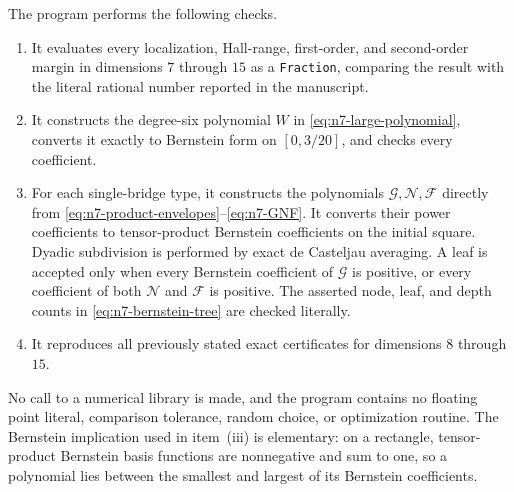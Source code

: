 \documentclass[11pt]{article}
\theoremstyle{definition}
\newcommand{\1}{\mathbf{1}}
\begin{document}
The program performs the following checks.
\begin{enumerate}[label=\textup{(\roman*)}]
\item It evaluates every localization, Hall-range, first-order, and
second-order margin in dimensions $7$ through $15$ as a
\texttt{Fraction}, comparing the result with the literal rational number
reported in the manuscript.
\item It constructs the degree-six polynomial $W$ in
\eqref{eq:n7-large-polynomial}, converts it exactly to Bernstein form on
$[0,3/20]$, and checks every coefficient.
\item For each single-bridge type, it constructs the polynomials
$\mathcal G,\mathcal N,\mathcal F$ directly from
\eqref{eq:n7-product-envelopes}--\eqref{eq:n7-GNF}.  It converts their power
coefficients to tensor-product Bernstein coefficients on the initial square.
Dyadic subdivision is performed by exact de Casteljau averaging.  A leaf is
accepted only when every Bernstein coefficient of $\mathcal G$ is positive,
or every coefficient of both $\mathcal N$ and $\mathcal F$ is positive.
The asserted node, leaf, and depth counts in
\eqref{eq:n7-bernstein-tree} are checked literally.
\item It reproduces all previously stated exact certificates for dimensions
$8$ through $15$.
\end{enumerate}

No call to a numerical library is made, and the program contains no floating
point literal, comparison tolerance, random choice, or optimization routine.
The Bernstein implication used in item~(iii) is elementary: on a rectangle,
tensor-product Bernstein basis functions are nonnegative and sum to one, so a
polynomial lies between the smallest and largest of its Bernstein
coefficients.
\end{document}
